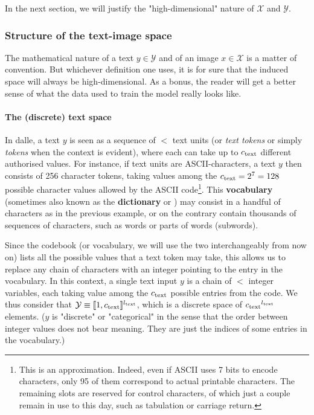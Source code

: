 \documentclass{article}
\begin{document}
\begin{multicols}{2}
In the next section, we will justify the "high-dimensional" nature of $\mathcal{X}$ and $\mathcal{Y}$.

\subsubsection{Structure of the text-image space}

The mathematical nature of a text $y \in \mathcal{Y}$ and of an image $x\in\mathcal{X}$ is a matter of convention. But whichever definition one uses, it is for sure that the induced space will always be high-dimensional. As a bonus, the reader will get a better sense of what the data used to train the model really looks like.

\paragraph{The (discrete) text space}

In \gls{dalle}, a text $y$ is seen as a sequence of $\lt$ text units (or \emph{text \glspl{token}} or simply \emph{tokens} when the context is evident), where each can take up to ${c_{\mathrm{text}}}$ different authorised values.
For instance, if text units are ASCII-characters, a text $y$ then consists of 256 character tokens, taking values among the ${c_{\mathrm{text}}}=2^7=128$ possible character values allowed by the ASCII code\footnote{
    This is an approximation.
    Indeed, even if ASCII uses 7 bits to encode characters, only 95 of them correspond to actual printable characters.
    The remaining slots are reserved for control characters, of which just a couple remain in use to this day, such as tabulation or carriage return.
    }.
This \textbf{vocabulary} (sometimes also known as the \textbf{dictionary} or ) may consist in a handful of characters as in the previous example, or on the contrary contain thousands of sequences of characters, such as words or parts of words (subwords).

Since the codebook (or vocabulary, we will use the two interchangeably from now on) lists all the possible values that a text token may take, this allows us to replace any chain of characters with an integer pointing to the entry in the vocabulary. 
In this context, a single text input $y$ is a chain of $\lt$ integer variables, each taking value among the ${c_{\mathrm{text}}}$ possible entries from the code.
We thus consider that $\mathcal{Y}\equiv [\![1,{c_{\mathrm{text}}} ]\!]^{{l_{\mathrm{text}}}}$, which is a discrete space of ${c_{\mathrm{text}}}^{l_{\mathrm{text}}}$ elements.
($y$ is "discrete" or "categorical" in the sense that the order between integer values does not bear meaning. They are just the indices of some entries in the vocabulary.)


\end{multicols}
\end{document}
